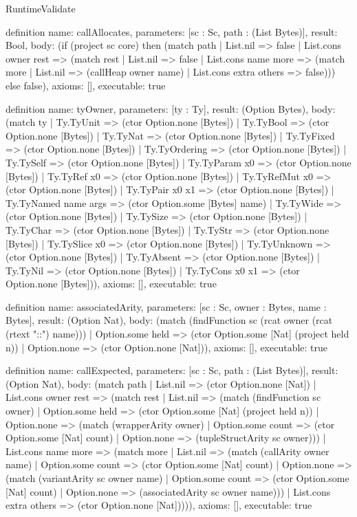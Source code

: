 \begin{lexlean}{RuntimeValidate}
\begin{semanticmodule}
definition{
  name: callAllocates,
  parameters: [sc : Sc, path : (List Bytes)],
  result: Bool,
  body: (if (project sc core) then (match path
    | List.nil => false
    | List.cons owner rest => (match rest
      | List.nil => false
      | List.cons name more => (match more
        | List.nil => (callHeap owner name)
        | List.cons extra others => false))) else false),
  axioms: [],
  executable: true
}

definition{
  name: tyOwner,
  parameters: [ty : Ty],
  result: (Option Bytes),
  body: (match ty
    | Ty.TyUnit => (ctor Option.none [Bytes])
    | Ty.TyBool => (ctor Option.none [Bytes])
    | Ty.TyNat => (ctor Option.none [Bytes])
    | Ty.TyFixed => (ctor Option.none [Bytes])
    | Ty.TyOrdering => (ctor Option.none [Bytes])
    | Ty.TySelf => (ctor Option.none [Bytes])
    | Ty.TyParam x0 => (ctor Option.none [Bytes])
    | Ty.TyRef x0 => (ctor Option.none [Bytes])
    | Ty.TyRefMut x0 => (ctor Option.none [Bytes])
    | Ty.TyPair x0 x1 => (ctor Option.none [Bytes])
    | Ty.TyNamed name args => (ctor Option.some [Bytes] name)
    | Ty.TyWide => (ctor Option.none [Bytes])
    | Ty.TySize => (ctor Option.none [Bytes])
    | Ty.TyChar => (ctor Option.none [Bytes])
    | Ty.TyStr => (ctor Option.none [Bytes])
    | Ty.TySlice x0 => (ctor Option.none [Bytes])
    | Ty.TyUnknown => (ctor Option.none [Bytes])
    | Ty.TyAbsent => (ctor Option.none [Bytes])
    | Ty.TyNil => (ctor Option.none [Bytes])
    | Ty.TyCons x0 x1 => (ctor Option.none [Bytes])),
  axioms: [],
  executable: true
}

definition{
  name: associatedArity,
  parameters: [sc : Sc, owner : Bytes, name : Bytes],
  result: (Option Nat),
  body: (match (findFunction sc (rcat owner (rcat (rtext "::") name)))
    | Option.some held => (ctor Option.some [Nat] (project held n))
    | Option.none => (ctor Option.none [Nat])),
  axioms: [],
  executable: true
}

definition{
  name: callExpected,
  parameters: [sc : Sc, path : (List Bytes)],
  result: (Option Nat),
  body: (match path
    | List.nil => (ctor Option.none [Nat])
    | List.cons owner rest => (match rest
      | List.nil => (match (findFunction sc owner)
        | Option.some held => (ctor Option.some [Nat] (project held n))
        | Option.none => (match (wrapperArity owner)
          | Option.some count => (ctor Option.some [Nat] count)
          | Option.none => (tupleStructArity sc owner)))
      | List.cons name more => (match more
        | List.nil => (match (callArity owner name)
          | Option.some count => (ctor Option.some [Nat] count)
          | Option.none => (match (variantArity sc owner name)
            | Option.some count => (ctor Option.some [Nat] count)
            | Option.none => (associatedArity sc owner name)))
        | List.cons extra others => (ctor Option.none [Nat])))),
  axioms: [],
  executable: true
}


\end{semanticmodule}
\end{lexlean}
